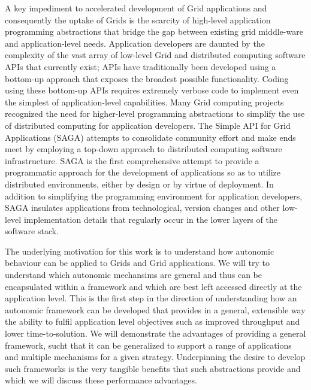 \documentclass[conference,final]{IEEEtran}
\newcommand{\jhanote}[1]{ {\textcolor{red} { ***Jha: #1 }}}
\newcommand{\yyenote}[1]{ {\textcolor{blue} { ***yye00: #1 }}}
\newcommand{\jhanote}[1]{}
\newcommand{\yyenote}[1]{}
\begin{document}

A key impediment to accelerated development of Grid applications and
consequently the uptake of Grids is the scarcity of high-level
application programming abstractions that bridge the gap between
existing grid middle-ware and application-level needs.  Application
developers are daunted by the complexity of the vast array of
low-level Grid and distributed computing software APIs that currently
exist; APIs have traditionally been developed using a bottom-up
approach that exposes the broadest possible functionality.  Coding
using these bottom-up APIs requires extremely verbose code to
implement even the simplest of application-level capabilities.  Many
Grid computing projects~\cite{gat, cog, realitygrid} recognized the
need for higher-level programming abstractions to simplify the use of
distributed computing for application developers.  The Simple API for
Grid Applications (SAGA) attempts to consolidate community effort and
make ends meet by employing a top-down approach to distributed
computing software infrastructure.  SAGA is the first comprehensive
attempt to provide a programmatic approach for the development of
applications so as to utilize distributed environments, either by
design or by virtue of deployment.  In addition to simplifying the
programming environment for application developers, SAGA insulates
applications from technological, version changes and other low-level
implementation details that regularly occur in the lower layers of the
software stack.

The underlying motivation for this work is to understand how autonomic
behaviour can be applied to Grids and Grid applications. We will try
to understand which autonomic mechansims are general and thus can be
encapsulated within a framework and which are best left accessed
directly at the application level. This is the first step in the
direction of understanding how an autonomic framework can be developed
that provides in a general, extensible way the ability to fulfil
application level objectives such as improved throughput and lower
time-to-solution. We will demonstrate the advantages of providing a
general framework, sucht that it can be generalized to support a range
of applications and multiple mechanisms for a given
strategy. Underpinning the desire to develop such frameworks is the
very tangible benefits that such abstractions provide and which we
will discuss these performance advantages.
\end{document}
